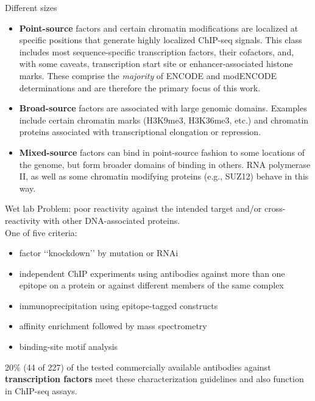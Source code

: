 \documentclass{beamer}
\begin{document}
\begin{frame}{Different sizes}
\begin{itemize}
\item \textbf{Point-source} factors and certain chromatin modifications are localized at specific positions that generate highly localized ChIP-seq signals. This class includes most sequence-specific transcription factors, their cofactors, and, with some caveats, transcription start site or enhancer-associated histone marks. These comprise the \textit{majority} of ENCODE and modENCODE determinations and are therefore the primary focus of this work.
\item \textbf{Broad-source} factors are associated with large genomic domains. Examples include certain chromatin marks (H3K9me3, H3K36me3, etc.) and chromatin proteins associated with transcriptional elongation or repression.
\item \textbf{Mixed-source} factors can bind in point-source fashion to some locations of the genome, but form broader domains of binding in others. RNA polymerase II, as well as some chromatin modifying proteins (e.g., SUZ12) behave in this way.
\end{itemize}
\end{frame}



\begin{frame}{Wet lab}
Problem: poor reactivity against the intended target and/or cross-reactivity with other DNA-associated proteins.\\
One of five criteria:
\begin{itemize}
\item factor ‘‘knockdown’’ by mutation or RNAi
\item independent ChIP experiments using antibodies against more than one epitope on a protein or against different members of the same complex
\item immunoprecipitation using epitope-tagged constructs
\item affinity enrichment followed by mass spectrometry
\item binding-site motif analysis
\end{itemize}
20\% (44 of 227) of the tested commercially available antibodies against \textbf{transcription factors} meet these characterization guidelines and also function in ChIP-seq assays.
\end{frame}
\end{document}

